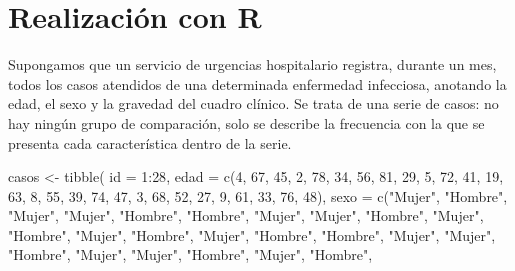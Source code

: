 \documentclass[
  spanish,
  a4paper,
]{scrreport}
\newenvironment{Shaded}{\begin{snugshade}}{\end{snugshade}}
\newcommand{\AttributeTok}[1]{\textcolor[rgb]{0.40,0.45,0.13}{#1}}
\newcommand{\DecValTok}[1]{\textcolor[rgb]{0.68,0.00,0.00}{#1}}
\newcommand{\FunctionTok}[1]{\textcolor[rgb]{0.28,0.35,0.67}{#1}}
\newcommand{\NormalTok}[1]{\textcolor[rgb]{0.00,0.23,0.31}{#1}}
\newcommand{\OtherTok}[1]{\textcolor[rgb]{0.00,0.23,0.31}{#1}}
\newcommand{\SpecialCharTok}[1]{\textcolor[rgb]{0.37,0.37,0.37}{#1}}
\newcommand{\StringTok}[1]{\textcolor[rgb]{0.13,0.47,0.30}{#1}}
\theoremstyle{definition}
\theoremstyle{definition}
\theoremstyle{remark}
\begin{document}
\section{Realización con R}\label{realizaciuxf3n-con-r}

Supongamos que un servicio de urgencias hospitalario registra, durante
un mes, todos los casos atendidos de una determinada enfermedad
infecciosa, anotando la edad, el sexo y la gravedad del cuadro clínico.
Se trata de una serie de casos: no hay ningún grupo de comparación, solo
se describe la frecuencia con la que se presenta cada característica
dentro de la serie.

\begin{Shaded}
\begin{Highlighting}[]
\NormalTok{casos }\OtherTok{\textless{}{-}} \FunctionTok{tibble}\NormalTok{(}
  \AttributeTok{id =} \DecValTok{1}\SpecialCharTok{:}\DecValTok{28}\NormalTok{,}
  \AttributeTok{edad =} \FunctionTok{c}\NormalTok{(}\DecValTok{4}\NormalTok{, }\DecValTok{67}\NormalTok{, }\DecValTok{45}\NormalTok{, }\DecValTok{2}\NormalTok{, }\DecValTok{78}\NormalTok{, }\DecValTok{34}\NormalTok{, }\DecValTok{56}\NormalTok{, }\DecValTok{81}\NormalTok{, }\DecValTok{29}\NormalTok{, }\DecValTok{5}\NormalTok{,}
           \DecValTok{72}\NormalTok{, }\DecValTok{41}\NormalTok{, }\DecValTok{19}\NormalTok{, }\DecValTok{63}\NormalTok{, }\DecValTok{8}\NormalTok{, }\DecValTok{55}\NormalTok{, }\DecValTok{39}\NormalTok{, }\DecValTok{74}\NormalTok{, }\DecValTok{47}\NormalTok{, }\DecValTok{3}\NormalTok{,}
           \DecValTok{68}\NormalTok{, }\DecValTok{52}\NormalTok{, }\DecValTok{27}\NormalTok{, }\DecValTok{9}\NormalTok{, }\DecValTok{61}\NormalTok{, }\DecValTok{33}\NormalTok{, }\DecValTok{76}\NormalTok{, }\DecValTok{48}\NormalTok{),}
  \AttributeTok{sexo =} \FunctionTok{c}\NormalTok{(}\StringTok{"Mujer"}\NormalTok{, }\StringTok{"Hombre"}\NormalTok{, }\StringTok{"Mujer"}\NormalTok{, }\StringTok{"Mujer"}\NormalTok{, }\StringTok{"Hombre"}\NormalTok{, }\StringTok{"Hombre"}\NormalTok{, }\StringTok{"Mujer"}\NormalTok{, }\StringTok{"Mujer"}\NormalTok{,}
           \StringTok{"Hombre"}\NormalTok{, }\StringTok{"Mujer"}\NormalTok{, }\StringTok{"Hombre"}\NormalTok{, }\StringTok{"Mujer"}\NormalTok{, }\StringTok{"Hombre"}\NormalTok{, }\StringTok{"Mujer"}\NormalTok{, }\StringTok{"Hombre"}\NormalTok{, }\StringTok{"Hombre"}\NormalTok{,}
           \StringTok{"Mujer"}\NormalTok{, }\StringTok{"Mujer"}\NormalTok{, }\StringTok{"Hombre"}\NormalTok{, }\StringTok{"Mujer"}\NormalTok{, }\StringTok{"Mujer"}\NormalTok{, }\StringTok{"Hombre"}\NormalTok{, }\StringTok{"Mujer"}\NormalTok{, }\StringTok{"Hombre"}\NormalTok{,}

\end{Highlighting}
\end{Shaded}
\end{document}
